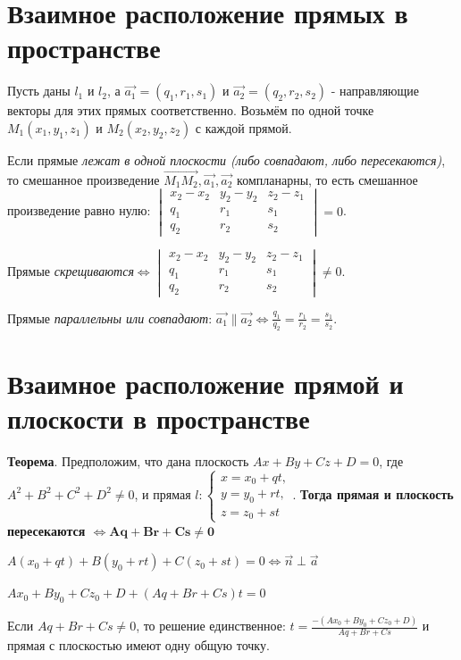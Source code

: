 \documentclass[a4paper]{article}
\begin{document}
{\begin{small}
\section*{Взаимное расположение прямых в пространстве}
Пусть даны $l_1$ и $l_2$, а $\vec{a_1} = (q_1, r_1, s_1)$ и $\vec{a_2} = (q_2, r_2, s_2)$ - направляющие векторы для этих прямых соответственно. Возьмём по одной точке $M_1(x_1, y_1, z_1)$ и $M_2(x_2, y_2, z_2)$ с каждой прямой.

Если прямые \textit{лежат в одной плоскости (либо совпадают, либо пересекаются)}, то смешанное произведение $\overrightarrow{M_1M_2}, \vec{a_1}, \vec{a_2}$ компланарны, то есть смешанное произведение равно нулю: $\displaystyle \begin{vmatrix}
x_2-x_2& y_2-y_2& z_2-z_1\\
q_1& r_1& s_1\\
q_2& r_2& s_2
\end{vmatrix} = 0$.

Прямые \textit{скрещиваются}$\displaystyle \Leftrightarrow \begin{vmatrix}
x_2-x_2& y_2-y_2& z_2-z_1\\
q_1& r_1& s_1\\
q_2& r_2& s_2
\end{vmatrix} \neq 0$.

Прямые \textit{параллельны или совпадают}: $\displaystyle \vec{a_1} \parallel \vec{a_2} \Leftrightarrow \frac{q_1}{q_2} = \frac{r_1}{r_2} = \frac{s_1}{s_2}$.


\section*{Взаимное расположение прямой и плоскости в пространстве}
\textbf{Теорема}. Предположим, что дана плоскость $Ax+By+Cz+D=0$, где $A^2+B^2+C^2+D^2\neq 0$, и прямая $\displaystyle l: \begin{cases}
x=x_0+qt,
\\
y=y_0+rt,
\\
z=z_0+st
\end{cases}$. \textbf{Тогда прямая и плоскость пересекаются $\mathbf{\Leftrightarrow Aq+Br+Cs \neq 0}$}

$A(x_0 + qt) + B(y_0 + rt) + C(z_0 + st) = 0 \Leftrightarrow \vec{n} \perp \vec{a}$

$Ax_0 + By_0 + Cz_0 + D + (Aq+Br+Cs)t=0$

Если $Aq+Br+Cs \neq 0$, то решение единственное: $\displaystyle t = \frac{-(Ax_0 + By_0 + Cz_0 + D)}{Aq+Br+Cs}$ и прямая с плоскостью имеют одну общую точку.


\end{small}}
\end{document}
